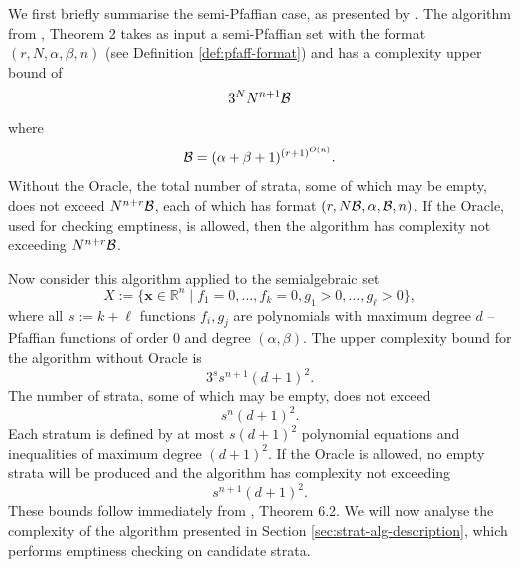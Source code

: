 \documentclass[
]{book}
\theoremstyle{definition}
\theoremstyle{definition}
\theoremstyle{definition}
\theoremstyle{definition}
\theoremstyle{remark}
\begin{document}
We first briefly summarise the semi-Pfaffian case, as presented by \citet{gv1995}.
The algorithm from \citet{gv1995}, Theorem 2 takes as input a semi-Pfaffian set with the format \((r, N, \alpha, \beta, n)\) (see Definition \ref{def:pfaff-format}) and has a complexity upper bound of
\[
3^N N^{n+1} {\cal B}
\]
where
\[
{\cal B} = (\alpha + \beta + 1)^{(r+1)^{O(n)}}.
\]
Without the Oracle, the total number of strata, some of which may be empty, does not exceed \(N^{n+r}{\cal B}\), each of which has format \((r, N{\cal B},\alpha, {\cal B}, n)\).
If the Oracle, used for checking emptiness, is allowed, then the algorithm has complexity not exceeding \(N^{n+r}{\cal B}\).

Now consider this algorithm applied to the semialgebraic set
\begin{equation}
X := \{ \mathbf{x} \in \mathbb{R}^n \mid f_1 = 0, \ldots, f_k = 0, g_1 > 0, \ldots, g_\ell > 0 \},
\label{eq:strat-imput-set}
\end{equation}
where all \(s := k + \ell\) functions \(f_i,g_j\) are polynomials with maximum degree \(d\) -- Pfaffian functions of order \(0\) and degree \((\alpha, \beta)\).
The upper complexity bound for the algorithm without Oracle is
\[
3^{s} s^{n+1} (d + 1)^2.
\]
The number of strata, some of which may be empty, does not exceed
\[s^{n} (d + 1)^2.\]
Each stratum is defined by at most \(s (d + 1)^2\) polynomial equations and inequalities of maximum degree \((d + 1)^2\).
If the Oracle is allowed, no empty strata will be produced and the algorithm has complexity not exceeding
\[
s^{n+1} (d + 1)^2.
\]
These bounds follow immediately from \citet{gv1995}, Theorem 6.2.
We will now analyse the complexity of the algorithm presented in Section \ref{sec:strat-alg-description}, which performs emptiness checking on candidate strata.
\end{document}
